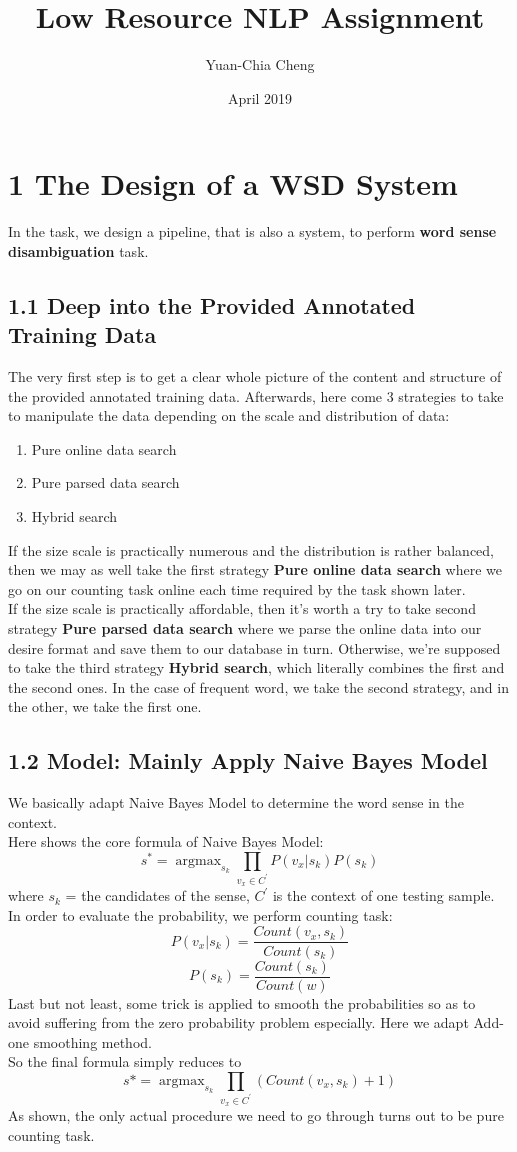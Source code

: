 \documentclass{article}
\title{Low Resource NLP Assignment}
\author{Yuan-Chia Cheng}
\date{April 2019}
\begin{document}
\maketitle


\section*{1 The Design of a WSD System}
In the task, we design a pipeline, that is also a system, to perform \textbf{word sense disambiguation} task.
\subsection*{1.1 Deep into the Provided Annotated Training Data}
The very first step is to get a clear whole picture of the content and structure of the provided annotated training data. Afterwards, here come 3 strategies to take to manipulate the data depending on the scale and distribution of data:
\begin{enumerate}
\item Pure online data search
\item Pure parsed data search
\item Hybrid search
\end{enumerate}
If the size scale is practically numerous and the distribution is rather balanced, then we may as well take the first strategy \textbf{Pure online data search} where we go on our counting task online each time required by the task shown later. \\
If the size scale is practically affordable, then it's worth a try to take second strategy \textbf{Pure parsed data search} where we parse the online data into our desire format and save them to our database in turn.
Otherwise, we're supposed to take the third strategy \textbf{Hybrid search}, which literally combines the first and the second ones. In the case of frequent word, we take the second strategy, and in the other, we take the first one.

\subsection*{1.2 Model: Mainly Apply Naive Bayes Model}
We basically adapt Naive Bayes Model to determine the word sense in the context.\\
Here shows the core formula of Naive Bayes Model:
\[
s^* = \mathop{\arg\max}_{s_k} \prod_{v_x \in C^{'}} P(v_x | s_k)P(s_k) \tag{1}
\]
where $s_k$ = the candidates of the sense, $C^{'}$ is the context of one testing sample. \\
In order to evaluate the probability, we perform counting task:
\[
P(v_x | s_k) = \frac{Count(v_x, s_k)}{Count(s_k)} \tag{2}
\]
\[
P(s_k) = \frac{Count(s_k)}{Count(w)} \tag{3}
\]
Last but not least, some trick is applied to smooth the probabilities so as to avoid suffering from the zero probability problem especially. Here we adapt Add-one smoothing method.\\
So the final formula simply reduces to
\[
s* = \mathop{\arg\max}_{s_k} \prod_{v_x \in C^{'}} (Count(v_x, s_k) + 1) \tag{4}
\]
As shown, the only actual procedure we need to go through turns out to be pure counting task.
\end{document}
